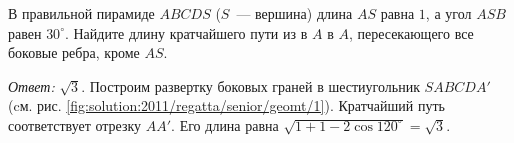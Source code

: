 В правильной пирамиде $ABCDS$ ($S$~--- вершина) длина $AS$ равна $1$, а угол
$ASB$ равен $30^\circ$.
Найдите длину кратчайшего пути из в $A$ в $A$, пересекающего все боковые ребра,
кроме $AS$.

%
\label{solution:2011/regatta/senior/geomt/1}%
\emph{Ответ:} $\sqrt{3}$.
Построим развертку боковых граней в шестиугольник $SABCDA'$
(cм. рис. \ref{fig:solution:2011/regatta/senior/geomt/1}).
Кратчайший путь соответствует отрезку $AA'$.
Его длина равна $\sqrt{1 + 1 - 2 \cos 120^\circ} = \sqrt{3}$.

